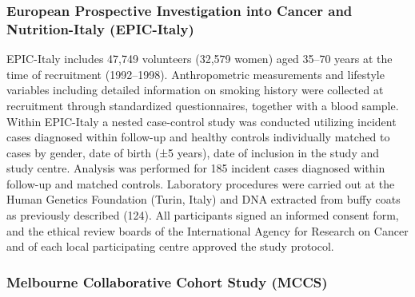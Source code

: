 \documentclass[11pt,oneside]{bristolthesis}
\begin{document}
\hypertarget{european-prospective-investigation-into-cancer-and-nutrition-italy-epic-italy}{%
\subsubsection{European Prospective Investigation into Cancer and Nutrition-Italy (EPIC-Italy)}\label{european-prospective-investigation-into-cancer-and-nutrition-italy-epic-italy}}

EPIC-Italy includes 47,749 volunteers (32,579 women) aged 35--70 years at the time of recruitment (1992--1998). Anthropometric measurements and lifestyle variables including detailed information on smoking history were collected at recruitment through standardized questionnaires, together with a blood sample. Within EPIC-Italy a nested case-control study was conducted utilizing incident cases diagnosed within follow-up and healthy controls individually matched to cases by gender, date of birth (±5 years), date of inclusion in the study and study centre. Analysis was performed for 185 incident cases diagnosed within follow-up and matched controls. Laboratory procedures were carried out at the Human Genetics Foundation (Turin, Italy) and DNA extracted from buffy coats as previously described (124). All participants signed an informed consent form, and the ethical review boards of the International Agency for Research on Cancer and of each local participating centre approved the study protocol.

\hypertarget{melbourne-collaborative-cohort-study-mccs}{%
\subsubsection{Melbourne Collaborative Cohort Study (MCCS)}\label{melbourne-collaborative-cohort-study-mccs}}
\end{document}
